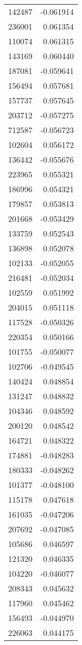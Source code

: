 \begin{tabular}{lr}
142487 & -0.061914 \\
236001 & 0.061354 \\
110074 & 0.061315 \\
143169 & 0.060440 \\
187081 & -0.059641 \\
156494 & 0.057681 \\
157737 & 0.057645 \\
203712 & -0.057275 \\
712587 & -0.056723 \\
102604 & 0.056172 \\
136442 & -0.055676 \\
223965 & 0.055321 \\
186996 & 0.054321 \\
179857 & 0.053813 \\
201668 & -0.053429 \\
133759 & 0.052543 \\
136898 & 0.052078 \\
102133 & -0.052055 \\
216481 & -0.052034 \\
102559 & 0.051992 \\
204015 & 0.051118 \\
117528 & -0.050326 \\
220354 & 0.050166 \\
101755 & -0.050077 \\
102706 & -0.049545 \\
140424 & 0.048854 \\
131247 & 0.048832 \\
104346 & 0.048592 \\
200120 & 0.048542 \\
164721 & 0.048322 \\
174881 & -0.048283 \\
180333 & -0.048262 \\
101377 & -0.048100 \\
115178 & 0.047618 \\
161035 & -0.047206 \\
207692 & -0.047085 \\
105686 & 0.046597 \\
121320 & 0.046335 \\
104220 & -0.046077 \\
208343 & 0.045632 \\
117960 & 0.045462 \\
156493 & -0.044970 \\
226063 & 0.044175 \\

\end{tabular}
